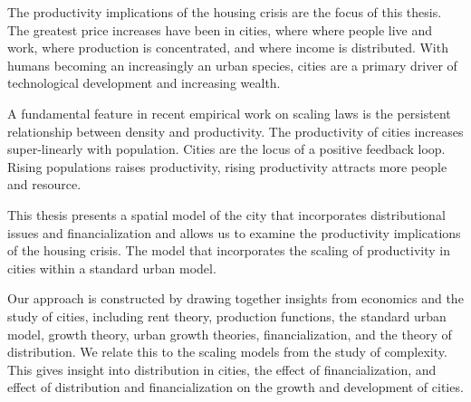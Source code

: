 The productivity implications of the housing crisis are the focus of this thesis.
The greatest price increases have been in cities, where where people live and work, where %
production is concentrated, %
and where income is distributed. With humans becoming an increasingly an urban species, cities are a primary driver of technological development and increasing wealth. 

A fundamental feature in recent empirical work on scaling laws is %
the persistent relationship between density and productivity. The productivity of cities increases super-linearly with population. Cities are the locus of a positive feedback loop. Rising populations raises productivity, rising productivity attracts more people and resource.

This thesis presents a spatial model of the city that incorporates distributional issues and financialization and allows us to examine the productivity implications of the housing crisis. The model that incorporates the scaling of productivity in cities within a standard urban model. 

Our approach is constructed by drawing together insights from %
economics and the study of cities, including rent theory, production functions, the standard urban model, growth theory, urban growth theories, financialization, and the theory of distribution.
We relate this to the scaling models from the study of complexity. This gives insight into %
distribution in cities, the effect of financialization, and effect of distribution and financialization on the growth and development of cities. 

